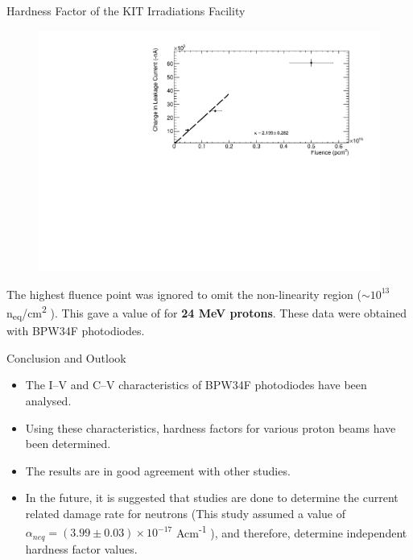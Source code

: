 \documentclass{beamer}
\begin{document}
    \begin{frame}{Hardness Factor of the KIT Irradiations Facility}
        \begin{figure}
            \centering
            \includegraphics[width = 0.8\linewidth]{KIT_seminar.pdf}
        \end{figure}
    The highest fluence point was ignored to omit the non-linearity region ($\sim 10^{13}$ n\textsubscript{eq}/cm\textsuperscript{2} \textsuperscript{\cite{Ravotti}}). This gave a value of  for \textbf{24 MeV protons}. These data were obtained with BPW34F photodiodes.    
    \end{frame}
    
\begin{frame}{Conclusion and Outlook}
  \begin{itemize}
  \item The I--V and C--V characteristics of BPW34F photodiodes have been analysed.
  \vspace{0.3cm}
  \item Using these characteristics, hardness factors for various proton beams have been determined.
  \vspace{0.3cm}
  \item The results are in good agreement with other studies.
  \vspace{0.3cm}
  \item In the future, it is suggested that studies are done to determine the current related damage rate for neutrons (This study assumed a value of $\alpha _{neq} = (3.99 \pm 0.03)\times 10^{-17}$ Acm\textsuperscript{-1} \textsuperscript{\cite{Moll}}), and therefore, determine independent hardness factor values.
  \end{itemize}    
\end{frame}
\end{document}

